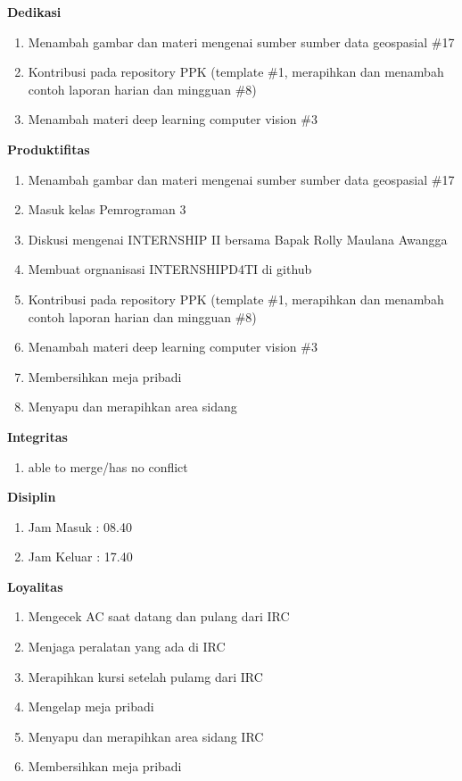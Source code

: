 \begin{enumerate}
\textbf{Dedikasi}
\begin{enumerate}
\item Menambah gambar dan materi mengenai sumber sumber data geospasial \#17
\item Kontribusi pada repository PPK (template \#1, merapihkan dan menambah contoh laporan harian dan mingguan \#8)
\item Menambah materi deep learning computer vision \#3
\end{enumerate}

\textbf{Produktifitas}
\begin{enumerate}
\item Menambah gambar dan materi mengenai sumber sumber data geospasial \#17
\item Masuk kelas Pemrograman 3 
\item Diskusi mengenai INTERNSHIP II bersama Bapak Rolly Maulana Awangga
\item Membuat orgnanisasi INTERNSHIPD4TI di github
\item Kontribusi pada repository PPK (template \#1, merapihkan dan menambah contoh laporan harian dan mingguan \#8)
\item Menambah materi deep learning computer vision \#3
\item Membersihkan meja pribadi
\item Menyapu dan merapihkan area sidang 
\end{enumerate}

\textbf{Integritas}
\begin{enumerate}
\item able to merge/has no conflict
\end{enumerate}


\textbf{Disiplin}
\begin{enumerate}
\item Jam Masuk : 08.40
\item Jam Keluar : 17.40
\end{enumerate}


\textbf{Loyalitas}
\begin{enumerate}
\item Mengecek AC saat datang dan pulang dari IRC
\item Menjaga peralatan yang ada di IRC
\item Merapihkan kursi setelah pulamg dari IRC
\item Mengelap meja pribadi
\item Menyapu dan merapihkan area sidang IRC
\item Membersihkan meja pribadi
\end{enumerate}
\end{enumerate}

